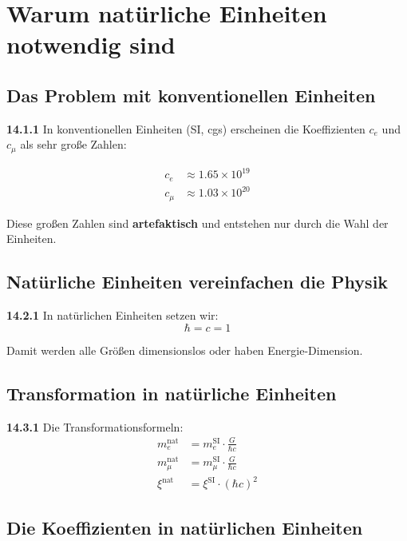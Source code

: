 \documentclass[12pt,a4paper]{article}
\begin{document}

\section{Warum natürliche Einheiten notwendig sind}

\subsection{Das Problem mit konventionellen Einheiten}

\noindent \textbf{14.1.1} In konventionellen Einheiten (SI, cgs) erscheinen die Koeffizienten $c_e$ und $c_\mu$ als sehr große Zahlen:

\begin{align*}
	c_e &\approx 1.65 \times 10^{19} \\
	c_\mu &\approx 1.03 \times 10^{20}
\end{align*}

Diese großen Zahlen sind \textbf{artefaktisch} und entstehen nur durch die Wahl der Einheiten.

\subsection{Natürliche Einheiten vereinfachen die Physik}

\noindent \textbf{14.2.1} In natürlichen Einheiten setzen wir:
\[
\hbar = c = 1
\]

Damit werden alle Größen dimensionslos oder haben Energie-Dimension.

\subsection{Transformation in natürliche Einheiten}

\noindent \textbf{14.3.1} Die Transformationsformeln:
\begin{align*}
	m_e^{\text{nat}} &= m_e^{\text{SI}} \cdot \frac{G}{\hbar c} \\
	m_\mu^{\text{nat}} &= m_\mu^{\text{SI}} \cdot \frac{G}{\hbar c} \\
	\xi^{\text{nat}} &= \xi^{\text{SI}} \cdot (\hbar c)^2
\end{align*}

\subsection{Die Koeffizienten in natürlichen Einheiten}
\end{document}

